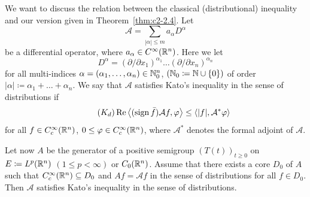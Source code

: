 We want to discuss the relation between the classical (distributional) inequality and our version given in Theorem~\ref{thm:c2-2.4}.
Let 
\[
\mathcal{A} =  \sum_{|\alpha| \leq m} a_{\alpha} D^{\alpha}
\]
be a differential operator, where $a_{\alpha} \in C^{\infty}(\mathbb{R}^n)$.
Here we let 
\[
D^{\alpha} = (\partial/\partial x_1)^{\alpha_1} \ldots (\partial/\partial x_{n})^{\alpha_{n}}
\]
for all multi-indices $\alpha = (\alpha_1,\ldots,\alpha_{n}) \in \mathbb{N}_{0}^n$, 
$(\mathbb{N}_{0} \coloneq \mathbb{N}\cup\{0\})$ of order $|\alpha| \coloneq \alpha_1 + \ldots + \alpha_{n}$.
We say that $\mathcal{A}$ satisfies Kato's inequality in the sense of distributions if
\begin{equation}\label{eq:c2-Kd} \tag{$K_{d}$}
\Re\left\langle(\sign \bar{f})\mathcal{A}f, \phi \right\rangle \leq \langle|f|, \mathcal{A}^{*}\phi \rangle
\end{equation}
for all $f \in C_{c}^{\infty}(\mathbb{R}^n)$, $0 \leq \phi \in C_{c}^{\infty}(\R^n)$, where $\mathcal{A}^{*}$ denotes the formal adjoint of\/ $\mathcal{A}$. 

Let now $A$ be the generator of a positive semigroup $(T(t))_{t \geq 0}$ on $E \coloneq L^p(\mathbb{R}^n)$ $(1 \leq p < \infty)$ or $C_{0}(\mathbb{R}^n)$.
Assume that there exists a core
$D_{0}$ of\/ $A$ such that $C_{c}^{\infty}(\mathbb{R}^n) \subseteq D_{0}$ and $Af = \mathcal{A}f$ in the sense of distributions for all $f \in D_{0}$.
Then $\mathcal{A}$ satisfies Kato's inequality in the sense of distributions.

